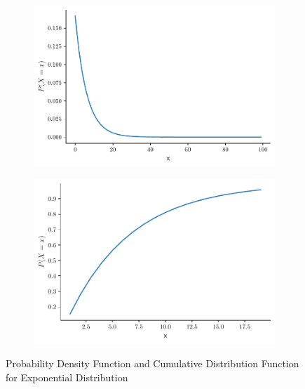 \documentclass[twoside,12pt]{report}  %
\begin{document}
\begin{tcolorbox}[colback=blue!5!white, colframe=blue!75!black, title = \textbf{Exponential Distribution Function}]
	\begin{figure}[H]
		\centering
		\begin{subfigure}[b]{0.3\textwidth}
			\includegraphics[width=\textwidth]{./images/exponentail_example.pdf}
		\end{subfigure}
		\begin{subfigure}[b]{0.3\textwidth}
			\includegraphics[width=\textwidth]{./images/exponentail_example_cdf.pdf}
		\end{subfigure}
		\caption{Probability Density Function and Cumulative Distribution Function for Exponential Distribution}
		\label{figure_exponentail_example}
	\end{figure}
	
\end{tcolorbox}
\end{document}
